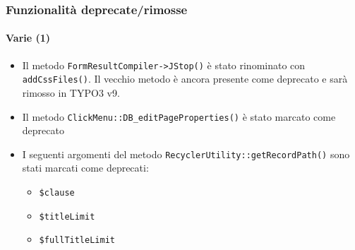 \begin{frame}[fragile]
	\frametitle{Funzionalità deprecate/rimosse}
	\framesubtitle{Varie (1)}

	\begin{itemize}
		\item Il metodo \texttt{FormResultCompiler->JStop()} è stato rinominato con \texttt{addCssFiles()}.
			Il vecchio metodo è ancora presente come deprecato e sarà rimosso in TYPO3 v9.

		\item Il metodo \texttt{ClickMenu::DB\_editPageProperties()} è stato marcato come deprecato

		\item I seguenti argomenti del metodo \texttt{RecyclerUtility::getRecordPath()} sono stati marcati come deprecati:

			\begin{itemize}
				\item \texttt{\$clause}
				\item \texttt{\$titleLimit}
				\item \texttt{\$fullTitleLimit}
			\end{itemize}

	\end{itemize}

\end{frame}


